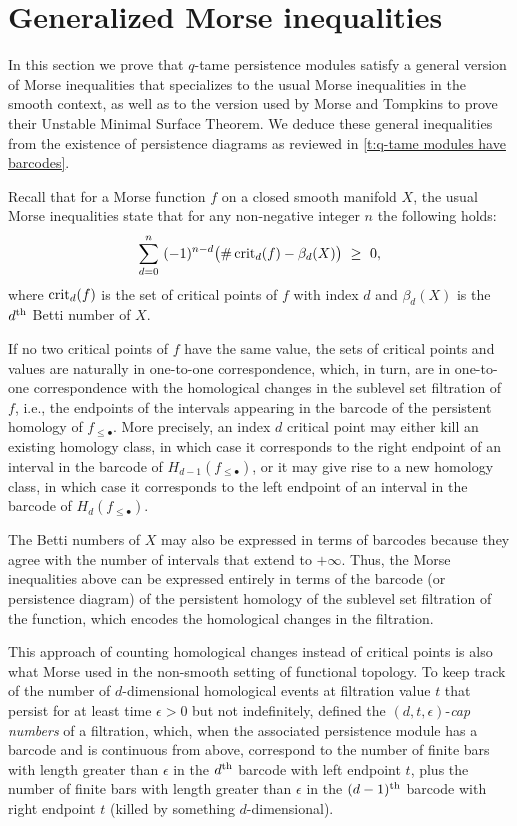 
\section{Generalized Morse inequalities} \label{s:inequalities}

In this section we prove that $q$-tame persistence modules satisfy a general version of Morse inequalities that specializes to the usual Morse inequalities in the smooth context, as well as to the version used by Morse and Tompkins to prove their Unstable Minimal Surface Theorem.
We deduce these general inequalities from the existence of persistence diagrams as reviewed in \cref{t:q-tame modules have barcodes}.

Recall that for a Morse function $f$ on a closed smooth manifold $X$, the usual Morse inequalities state that for any non-negative integer $n$ the following holds:
\begin{equation} \label{e:morse_inequalities}
\sum_{d=0}^n \ (-1)^{n-d} \big( \# \crit_{d}(f) - \beta_{d}(X) \big) \ \geq \ 0,
\end{equation}
where $\operatorname{crit}_{d}(f)$ is the set of critical points of $f$ with index $d$ and $\beta_{d}(X)$ is the $d^{\mathrm{th}}$ Betti number of $X$.

If no two critical points of $f$ have the same value, the sets of critical points and values are naturally in one-to-one correspondence, which, in turn, are in one-to-one correspondence with the homological changes in the sublevel set filtration of $f$, i.e., the endpoints of the intervals appearing in the barcode of the persistent homology of $f_{\leq \bullet}$.
More precisely, an index $d$ critical point may either kill an existing homology class, in which case it corresponds to the right endpoint of an interval in the barcode of $H_{d-1}(f_{\leq \bullet})$, or it may give rise to a new homology class, in which case it corresponds to the left endpoint of an interval in the barcode of $H_d(f_{\leq \bullet})$.

The Betti numbers of $X$ may also be expressed in terms of barcodes because they agree with the number of intervals that extend to $+\infty$.
Thus, the Morse inequalities above can be expressed entirely in terms of the barcode (or persistence diagram) of the persistent homology of the sublevel set filtration of the function, which encodes the homological changes in the filtration.

This approach of counting homological changes instead of critical points is also what Morse used in the non-smooth setting of functional topology.
To keep track of the number of $d$-dimensional homological events at filtration value $t$ that persist for at least time $\epsilon > 0$ but not indefinitely, \citet{Morse.1940} defined the $(d, t, \epsilon)$-\emph{cap numbers} of a filtration, which, when the associated persistence module has a barcode and is continuous from above, correspond to the number of finite bars with length greater than $\epsilon$ in the $d^{\mathrm{th}}$ barcode with left endpoint $t$, plus the number of finite bars with length greater than $\epsilon$ in the $(d-1)^{\mathrm{th}}$ barcode with right endpoint $t$ (killed by something $d$-dimensional).

